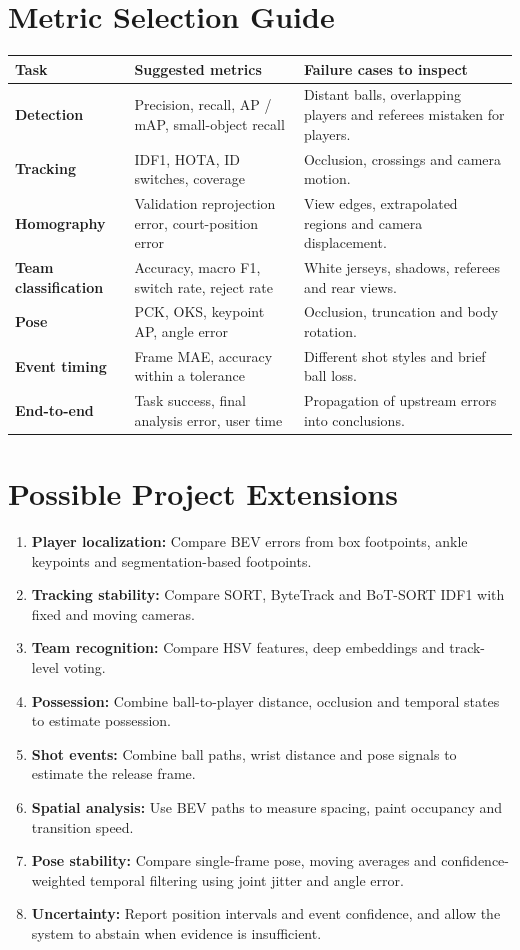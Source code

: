 \documentclass[11pt,a4paper,oneside]{report}
\begin{document}
\chapter{Metric Selection Guide}

\begin{tabularx}{\textwidth}{>{\bfseries\RaggedRight}p{3.3cm} Y Y}
\toprule
Task & Suggested metrics & Failure cases to inspect \\
\midrule
Detection & Precision, recall, AP / mAP, small-object recall & Distant balls, overlapping players and referees mistaken for players.\\
Tracking & IDF1, HOTA, ID switches, coverage & Occlusion, crossings and camera motion.\\
Homography & Validation reprojection error, court-position error & View edges, extrapolated regions and camera displacement.\\
Team classification & Accuracy, macro F1, switch rate, reject rate & White jerseys, shadows, referees and rear views.\\
Pose & PCK, OKS, keypoint AP, angle error & Occlusion, truncation and body rotation.\\
Event timing & Frame MAE, accuracy within a tolerance & Different shot styles and brief ball loss.\\
End-to-end & Task success, final analysis error, user time & Propagation of upstream errors into conclusions.\\
\bottomrule
\end{tabularx}

\chapter{Possible Project Extensions}

\begin{enumerate}
  \item \textbf{Player localization:} Compare BEV errors from box footpoints, ankle keypoints and segmentation-based footpoints.
  \item \textbf{Tracking stability:} Compare SORT, ByteTrack and BoT-SORT IDF1 with fixed and moving cameras.
  \item \textbf{Team recognition:} Compare HSV features, deep embeddings and track-level voting.
  \item \textbf{Possession:} Combine ball-to-player distance, occlusion and temporal states to estimate possession.
  \item \textbf{Shot events:} Combine ball paths, wrist distance and pose signals to estimate the release frame.
  \item \textbf{Spatial analysis:} Use BEV paths to measure spacing, paint occupancy and transition speed.
  \item \textbf{Pose stability:} Compare single-frame pose, moving averages and confidence-weighted temporal filtering using joint jitter and angle error.
  \item \textbf{Uncertainty:} Report position intervals and event confidence, and allow the system to abstain when evidence is insufficient.
\end{enumerate}
\end{document}
